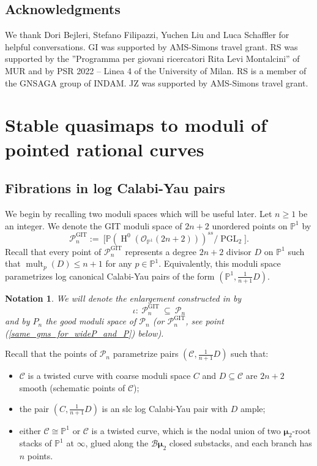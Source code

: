 \documentclass[a4paper,12pt]{amsart}
\DeclareMathOperator{\PGL}{PGL}
\DeclareMathOperator{\mult}{mult}
\DeclareMathOperator{\GIT}{GIT}
\newcommand{\bP}{{\mathbb P}}
\newcommand{\sP}{{\mathscr{P}}}
\newcommand{\cB}{{\mathcal{B}}}
\newcommand{\cO}{{\mathcal{O}}}
\newcommand{\bmu}{\bm{\mu}}
\newcommand{\oH}{{\operatorname{H}}}
\newcommand\cC{{\mathcal{C}}}
\newtheorem*{notation}{Notation}
\theoremstyle{definition}
\theoremstyle{remark}
\begin{document}
\subsection*{Acknowledgments}
We thank Dori Bejleri, Stefano Filipazzi, Yuchen Liu and Luca Schaffler for helpful conversations. GI was supported by AMS-Simons travel grant. RS was supported by the ''Programma per giovani ricercatori Rita Levi Montalcini” of
MUR and by PSR 2022 – Linea 4 of the University of Milan. RS is a member of the GNSAGA
group of INDAM. JZ was supported by AMS-Simons travel grant.


\section{Stable quasimaps to moduli of pointed rational curves}\label{section_prelim_on_qmaps}

\subsection{Fibrations in log Calabi-Yau pairs}
We begin by recalling two moduli spaces which will be useful later.  
Let $n\geq 1$ be an integer. We denote the GIT moduli space of $2n+2$ unordered points on $\bP^1$ by $$\sP_n^{\GIT} :=\ \big[\bP(\oH^0(\cO_{\bP^1}(2n + 2)))^{ss}/\PGL_2\big].$$ Recall that every point of $\sP_n^{\GIT}$ represents a degree $2n+2$ divisor $D$ on $\bP^1$ such that $\mult_p(D)\leq n+1$ for any $p\in \bP^1$. Equivalently, this moduli space parametrizes log canonical Calabi-Yau pairs of the form $(\bP^1,\frac{1}{n + 1}D)$.

\begin{notation}
    \textup{We will denote the enlargement constructed in \cite[Appendix A.2.1]{twisted_map_2} by \[ \iota:\ \sP_n^{\GIT}\ \subseteq \ \sP_n\]
    and by $P_n$ the good moduli space of $\sP_n$ (or $\sP_n^{\GIT}$, see point (\ref{same_gms_for_wideP_and_P}) below).}
\end{notation}
Recall that the points of $\sP_n$ parametrize pairs $(\cC,\frac{1}{n+1}D)$ such that:

\begin{itemize}
\item $\cC$ is a twisted curve with coarse moduli space $C$ and $D\subseteq \cC$ are $2n+2$ smooth (schematic points of $\cC$);
\item the pair $(C,\frac{1}{n+1}D)$ is an slc log Calabi-Yau pair with $D$ ample;
    \item either $\cC\cong \bP^1$ or $\cC$ is a twisted curve, which is the nodal union of two $\bmu_2$-root stacks of $\bP^1$ at $\infty$, glued along the $\cB\bmu_2$ closed substacks, and each branch has $n$ points.
\end{itemize}
\end{document}
